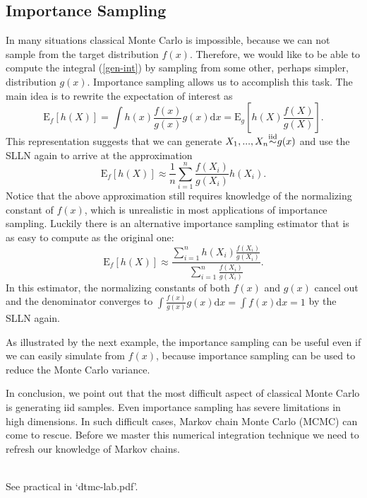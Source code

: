 \documentclass[11pt]{article}\usepackage[]{graphicx}\usepackage[]{color}
\numberwithin{algorithm}{section}
\theoremstyle{remark}
\theoremstyle{definition}
\newenvironment{example}[1]{\begin{trivlist}
\item[\hskip \labelsep {\bfseries Example}: \underline{#1}]\ \\}{\end{trivlist}}
\begin{document}
\subsection*{Importance Sampling}
In many situations classical Monte Carlo is impossible, because we can not sample from the target
distribution $f(x)$. Therefore, we would like to be able to compute the integral (\ref{gen-int})
by sampling from some other, perhaps simpler, distribution $g(x)$. Importance sampling allows us to 
accomplish this task. The main idea is to rewrite the expectation of interest as
\begin{equation*}
  \text{E}_f[h(X)]=  
  \int h(x)\frac{f(x)}{g(x)}g(x)\text{d}x = \text{E}_g\left[h(X) \frac{f(X)}{g(X)}\right].  
\end{equation*}
This representation suggests that we can generate $X_1,...,X_n {\buildrel \text{iid} \over \sim} g(x)$ and 
use the SLLN again to arrive at the approximation
\begin{equation*}
  \text{E}_f[h(X)] \approx \frac{1}{n}\sum_{i = 1}^n \frac{f(X_i)}{g(X_i)}h(X_i).
\end{equation*}
Notice that the above approximation still requires knowledge of the normalizing constant of $f(x)$, which
is unrealistic in most applications of importance sampling. Luckily there is an alternative importance
sampling estimator that is as easy to compute as the original one:
\begin{equation*}
  \text{E}_f[h(X)] \approx  \frac{\sum_{i=1}^n h(X_i) \frac{f(X_i)}{g(X_i)}}{\sum_{i=1}^n \frac{f(X_i)}{g(X_i)}}.  
\end{equation*}
In this estimator, the normalizing constants of both $f(x)$ and $g(x)$ cancel out and the denominator
converges to $\int \frac{f(x)}{g(x)}g(x) \text{d}x = \int f(x)\text{d}x = 1$ by the SLLN again.
\par
As illustrated by the next example, the importance sampling can be useful even if we can easily 
simulate from $f(x)$, because importance sampling can be used to reduce the Monte Carlo variance.

In conclusion, we point out that the most difficult aspect of classical Monte Carlo is generating
iid samples. Even importance sampling has severe limitations in high dimensions. In such difficult 
cases, Markov chain Monte Carlo (MCMC) can come to rescue. Before we master this numerical integration
technique we need to refresh our knowledge of Markov chains.

\begin{example}{Estimating the tail of the standard normal distribution}
See practical in `dtmc-lab.pdf'.
\end{example}
\end{document}
